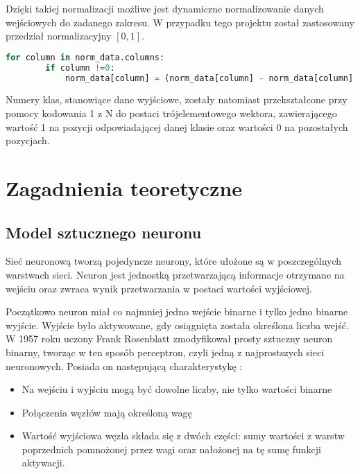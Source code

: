 \documentclass[12pt,twoside]{article}
\begin{document}
Dzięki takiej normalizacji możliwe jest dynamiczne normalizowanie danych wejściowych do zadanego zakresu. W przypadku tego projektu został zastosowany przedział normalizacyjny $ [0, 1]$.\\

\begin{lstlisting}[language=Python,caption=Algorytm normalizacji,label={Kod1}]
    for column in norm_data.columns:
        if column !=0:
            norm_data[column] = (norm_data[column] - norm_data[column].min()) / (norm_data[column].max() - norm_data[column].min())

\end{lstlisting}

Numery klas, stanowiące dane wyjściowe, zostały natomiast przekształcone przy pomocy kodowania 1 z N do postaci trójelementowego wektora, zawierającego wartość 1 na pozycji odpowiadającej danej klasie oraz wartości 0 na pozostałych pozycjach.



\clearpage
\section{Zagadnienia teoretyczne}
\subsection{Model sztucznego neuronu}
Sieć neuronową  tworzą pojedyncze neurony, które ułożone są w poszczególnych warstwach sieci. Neuron jest jednostką przetwarzającą informacje otrzymane na wejściu oraz zwraca wynik przetwarzania w postaci wartości wyjściowej. 

Początkowo neuron miał co najmniej jedno wejście binarne i tylko jedno binarne wyjście. Wyjście było aktywowane, gdy osiągnięta została określona liczba wejść. W 1957 roku uczony Frank Rosenblatt zmodyfikował prosty sztuczny neuron binarny, tworząc w ten sposób perceptron, czyli jedną z najprostszych sieci neuronowych. Posiada on następującą charakterystykę \cite{mamczur}:
\begin{itemize}
\item Na wejściu i wyjściu mogą być dowolne liczby, nie tylko wartości binarne 
\item Połączenia węzłów mają określoną wagę
\item Wartość wyjściowa węzła składa się z dwóch części: sumy wartości z warstw poprzednich pomnożonej przez wagi oraz nałożonej na tę sumę funkcji aktywacji.
\end{itemize}
\end{document}

